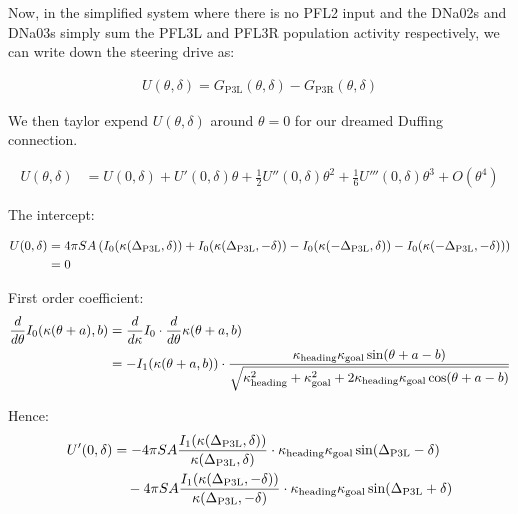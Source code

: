 \documentclass[11pt,a4paper]{article}
\begin{document}
  Now, in the simplified system where there is no PFL2 input and the DNa02s and DNa03s simply sum the PFL3L and PFL3R population activity respectively, we can write down the steering drive as:

  \begin{align}
    U(\theta, \delta) = G_{\mathrm{P3L}}(\theta, \delta) - G_{\mathrm{P3R}}(\theta, \delta) 
  \end{align}


  We then taylor expend $U(\theta, \delta)$ around $\theta = 0$ for our dreamed Duffing connection. 

  \begin{align}
    U(\theta, \delta) & = U(0, \delta) + U'(0, \delta) \theta + \frac{1}{2} U''(0, \delta) \theta^2 + \frac{1}{6} U'''(0, \delta) \theta^3 + O(\theta^4)
  \end{align}

  The intercept:

  \begin{align}
    U(0, \delta) & = 4\pi SA \left(I_0(\kappa(\Delta_{\mathrm{P3L}}, \delta)) + I_0(\kappa(\Delta_{\mathrm{P3L}}, -\delta)) - I_0(\kappa(-\Delta_{\mathrm{P3L}}, \delta)) - I_0(\kappa(-\Delta_{\mathrm{P3L}}, -\delta))\right) \notag \\
    & = 0
  \end{align}

  First order coefficient:
  \begin{align}
    \frac{d}{d\theta}I_0(\kappa(\theta + a), b) & = \frac{d}{d\kappa}I_0 \cdot \frac{d}{d\theta}\kappa(\theta + a, b) \notag \\
    & =- I_1(\kappa(\theta + a, b)) \cdot \frac{\kappa_{\mathrm{heading}} \kappa_{\mathrm{goal}} \sin(\theta + a - b)}{\sqrt{\kappa_{\mathrm{heading}}^2 + \kappa_{\mathrm{goal}}^2 + 2\kappa_{\mathrm{heading}}\kappa_{\mathrm{goal}}\cos(\theta + a - b)}}
  \end{align}
  
  Hence: 
  \begin{align}
    U'(0, \delta) &= -4\pi SA \frac{I_1(\kappa(\Delta_{\mathrm{P3L}}, \delta))}{\kappa(\Delta_{\mathrm{P3L}}, \delta)} \cdot \kappa_{\mathrm{heading}} \kappa_{\mathrm{goal}} \sin(\Delta_{\mathrm{P3L}} - \delta) \notag \\
    & \quad - 4\pi SA \frac{I_1(\kappa(\Delta_{\mathrm{P3L}}, -\delta))}{\kappa(\Delta_{\mathrm{P3L}}, -\delta)} \cdot \kappa_{\mathrm{heading}} \kappa_{\mathrm{goal}} \sin(\Delta_{\mathrm{P3L}} + \delta)
  \end{align}
\end{document}
